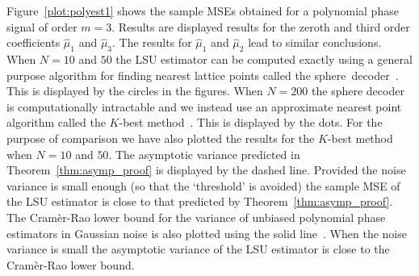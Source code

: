 \documentclass[aap]{imsart}
\begin{document}
Figure~\ref{plot:polyest1} shows the sample MSEs obtained for a polynomial phase signal of order $m=3$.  Results are displayed results for the zeroth and third order coefficients $\widehat{\mu}_1$ and $\widehat{\mu}_3$.  The results for $\widehat{\mu}_1$ and $\widehat{\mu}_2$ lead to similar conclusions.  When $N = 10$ and $50$ the LSU estimator can be computed exactly using a general purpose algorithm for finding nearest lattice points called the sphere~decoder~\cite{Pohst_sphere_decoder_1981,Agrell2002,Viterbo_sphere_decoder_1999}.  This is displayed by the circles in the figures.  When $N=200$ the sphere decoder is computationally intractable and we instead use an approximate nearest point algorithm called the $K$-best method~\cite{Zhan2006_K_best_sphere_decoder}.  This is displayed by the dots.  For the purpose of comparison we have also plotted the results for the $K$-best method when $N = 10$ and $50$.  The asymptotic variance predicted in Theorem~\ref{thm:asymp_proof} is displayed by the dashed line.  Provided the noise variance is small enough (so that the `threshold' is avoided) the sample MSE of the LSU estimator is close to that predicted by Theorem~\ref{thm:asymp_proof}.  The Cram\`{e}r-Rao lower bound for the variance of unbiased polynomial phase estimators in Gaussian noise is also plotted using the solid line~\cite{Peleg1991_CRB_PPS_1991}.  When the noise variance is small the asymptotic variance of the LSU estimator is close to the Cram\`{e}r-Rao lower bound.  


 
\end{document}
